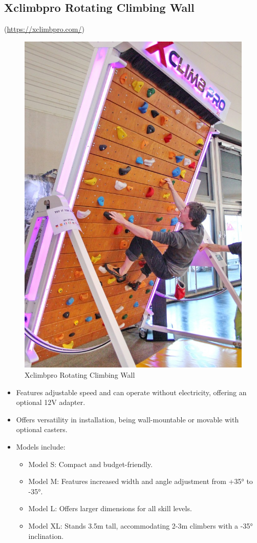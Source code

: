 \subsection{Xclimbpro Rotating Climbing Wall} (\url{https://xclimbpro.com/})
\begin{figure}[H]
    \centering
    \includegraphics[width=0.6\linewidth]{figs/Xclimbpro.jpg}
    \caption{Xclimbpro Rotating Climbing Wall}
\end{figure}
    \begin{itemize}
        \item Features adjustable speed and can operate without electricity, offering an optional 12V adapter.
        \item Offers versatility in installation, being wall-mountable or movable with optional casters.
        \item Models include:
        \begin{itemize}
            \item Model S: Compact and budget-friendly.
            \item Model M: Features increased width and angle adjustment from +35° to -35°.
            \item Model L: Offers larger dimensions for all skill levels.
            \item Model XL: Stands 3.5m tall, accommodating 2-3m climbers with a -35° inclination.
        \end{itemize}
    \end{itemize}

